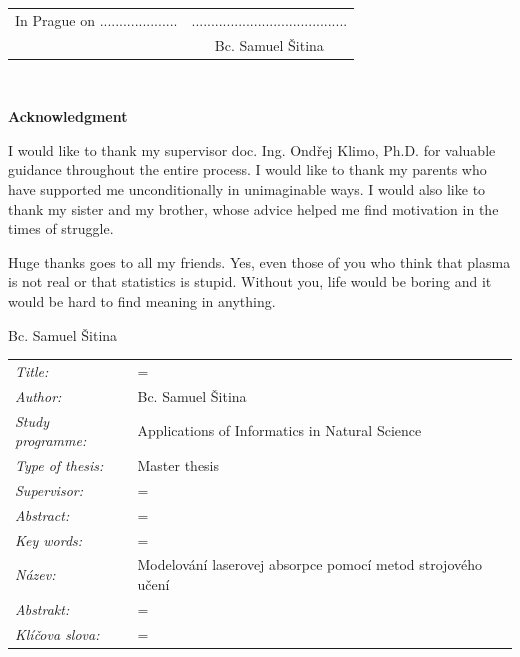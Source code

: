 \documentclass[a4paper,oneside,12pt]{book}
\newcommand{\tb}{\textbf} %
\newcommand{\cvut}{Czech Technical University in~Prague}
\newcommand{\fjfi}{Faculty of Nuclear Sciences and Physical Engineering}
\newcommand{\katedraKLFF}{Department of Laser Physics and Photonics}
\newcommand{\program}{Applications of Informatics in Natural Science} %
\newcommand{\druh}{Master thesis} %
\newcommand{\nazevcz}{Modelování laserovej absorpce pomocí metod strojového učení}    %
\newcommand{\nazeven}{Modelling laser absorption using machine learning methods}          %
\newcommand{\autor}{Bc. Samuel Šitina}   %
\newcommand{\vedouci}{doc. Ing. Ondřej Klimo, Ph.D.} %
\newcommand{\pracovisteVed}{\katedraKLFF, \fjfi, \cvut} %
\newcommand{\klicova}{laser-plasma, absorpce, teplota horkých elektronů, Gaussovské Procesy}   %
\newcommand{\keyword}{laser-plasma, absorption, hot electron temperature, particle-in-cell, Gaussian Process}       %
\newcommand{\abstrCZ}{Tato práce představuje možnosti modelování absorpce laseru s vysokou intenzitou a krátkým pulzem v plazmatu pro laserové intenzity v rozmezí od $10^{17}\, \mathrm{W.cm}^{-2}$ do $10^{19}\,\mathrm{W.cm}^{-2}$. Vstupními parametry modelů jsou intenzita laseru, délka škály exponenciálního předplazmového profilu a úhel dopadu laseru na terč. Pro trénink modelů byly použity teploty horkých elektronů z více než 300 simulací metodou particle-in-cell s různými nastaveními. Byla navržena metoda pro automatické fitování teploty horkých elektronů. Vyhodnotili jsme regresné schopnosti Support Vector Regression, neuronových sítí a Gaussovských Procesů (GP) a zjistili jsme, že GP nabízí v této aplikaci nejlepší zobecnění. Diskutuje se strategie pro efektivní rozšíření datové sady.}    %
\newcommand{\abstrEN}{This thesis presents possibilities for surrogate modelling of high-intensity short-pulse laser absorption in plasma for laser intensities ranging from $10^{17}\, \mathrm{W.cm}^{-2}$ to $10^{19}\,\mathrm{W.cm}^{-2}$. The input parameters of the models are laser intensity, scale length of the exponential preplasma profile and angle of incidence. For training of the models, hot electron temperatures from more than 300 particle-in-cell simulations with different settings were used. A method for automatic hot electron temperature fitting is proposed. We evaluated Support Vector Regression, Neural Network, and Gaussian Processes (GP) regression models, finding GP to offer the best generalization. A strategy for effective dataset expansion is discussed.}
\newcommand{\podekovani}{I would like to thank my supervisor doc. Ing. Ondřej Klimo, Ph.D. for valuable guidance throughout the entire process. I would like to thank my parents who have supported me unconditionally in unimaginable ways. I would also like to thank my sister and my brother, whose advice helped me find motivation in the times of struggle.

Huge thanks goes to all my friends. Yes, even those of you who think that plasma is not real or that statistics is stupid. Without you, life would be boring and it would be hard to find meaning in anything.}
\begin{document}
\vspace{2em}  %
\hspace{-0.5em}\begin{tabularx}{\textwidth}{X c}  %
In Prague on .................... &........................................ \\	%
	& \autor
\end{tabularx}	%


\newpage
\thispagestyle{empty}

~
\vfill %

\tb{Acknowledgment}

\vspace{1em} %
\podekovani
\begin{flushright}
\autor
\end{flushright}  %


\newpage   %
\thispagestyle{empty}   %

\newbox\odstavecbox
\newlength\vyskaodstavce
\newcommand\odstavec[2]{%
    \setbox\odstavecbox=\hbox{%
         \parbox[t]{#1}{#2\vrule width 0pt depth 4pt}}%
    \global\vyskaodstavce=\dp\odstavecbox
    \box\odstavecbox}
\newcommand{\delka}{120mm} %

\begin{tabular}{ll}
  {\em Title:} & \odstavec{\delka}{\nazeven} \\[1em]
  {\em Author:} & \autor \\[1em]
  {\em Study programme:} & \program \\[1em]
  {\em Type of thesis:} & \druh \\[1em]
  {\em Supervisor:} & \odstavec{\delka}{\vedouci\ \pracovisteVed} \\ [4em]
  {\em Abstract:} & \odstavec{\delka}{\abstrEN} \\ [13em]
 
  {\em Key words:} & \odstavec{\delka}{\keyword} \\[2em]

  {\em Název:} & \nazevcz \\[1em]
  {\em Abstrakt:} & \odstavec{\delka}{\abstrCZ} \\ [14em]
  {\em Klíčova slova:} & \odstavec{\delka}{\klicova}
\end{tabular}
\end{document}

